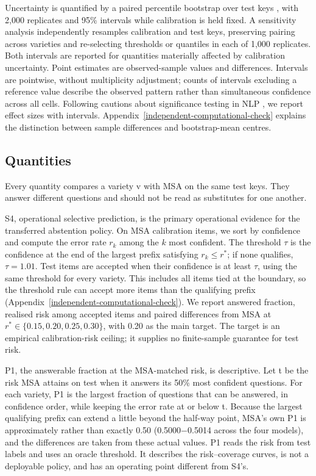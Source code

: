 \documentclass[applsci,article,submit,pdftex,oneauthor]{Definitions/mdpi}
\begin{document}
Uncertainty is quantified by a paired percentile bootstrap over test keys \cite{efron1993bootstrap, koehn2004statistical}, with 2,000 replicates and 95\% intervals while calibration is held fixed. A sensitivity analysis independently resamples calibration and test keys, preserving pairing across varieties and re-selecting thresholds or quantiles in each of 1,000 replicates. Both intervals are reported for quantities materially affected by calibration uncertainty. Point estimates are observed-sample values and differences. Intervals are pointwise, without multiplicity adjustment; counts of intervals excluding a reference value describe the observed pattern rather than simultaneous confidence across all cells. Following cautions about significance testing in NLP \cite{dror2018hitchhiker}, we report effect sizes with intervals. Appendix~\ref{independent-computational-check} explains the distinction between sample differences and bootstrap-mean centres.

\hypertarget{quantities}{%
\subsection{Quantities}\label{quantities}}

Every quantity compares a variety v with MSA on the same test keys. They answer different questions and should not be read as substitutes for one another.

S4, operational selective prediction, is the primary operational evidence for the transferred abstention policy. On MSA calibration items, we sort by confidence and compute the error rate $r_k$ among the $k$ most confident. The threshold $\tau$ is the confidence at the end of the largest prefix satisfying $r_k \leq r^*$; if none qualifies, $\tau=1.01$. Test items are accepted when their confidence is at least $\tau$, using the same threshold for every variety. This includes all items tied at the boundary, so the threshold rule can accept more items than the qualifying prefix (Appendix~\ref{independent-computational-check}). We report answered fraction, realised risk among accepted items and paired differences from MSA at $r^*\in\{0.15,0.20,0.25,0.30\}$, with 0.20 as the main target. The target is an empirical calibration-risk ceiling; it supplies no finite-sample guarantee for test risk.

P1, the answerable fraction at the MSA-matched risk, is descriptive. Let t be the risk MSA attains on test when it answers its 50\% most confident questions. For each variety, P1 is the largest fraction of questions that can be answered, in confidence order, while keeping the error rate at or below t. Because the largest qualifying prefix can extend a little beyond the half-way point, MSA's own P1 is approximately rather than exactly 0.50 (0.5000$-$0.5014 across the four models), and the differences are taken from these actual values. P1 reads the risk from test labels and uses an oracle threshold. It describes the risk--coverage curves, is not a deployable policy, and has an operating point different from S4's.
\end{document}
